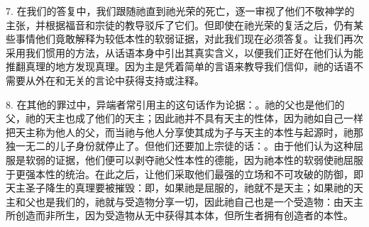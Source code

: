 7. 在我们的答复中，我们跟随祂直到祂光荣的死亡，逐一审视了他们不敬神学的主张，并根据福音和宗徒的教导驳斥了它们。但即使在祂光荣的复活之后，仍有某些事情他们竟敢解释为较低本性的软弱证据，对此我们现在必须答复。让我们再次采用我们惯用的方法，从话语本身中引出其真实含义，以便我们正好在他们认为能推翻真理的地方发现真理。因为主是凭着简单的言语来教导我们信仰，祂的话语不需要从外在和无关的言论中获得支持或注释。\par

8. 在其他的罪过中，异端者常引用主的这句话作为论据：。祂的父也是他们的父，祂的天主也成了他们的天主；因此祂并不具有天主的性体，因为祂如自己一样把天主称为他人的父，而当祂与他人分享使其成为子与天主的本性与起源时，祂那独一无二的儿子身份就停止了。但他们还要加上宗徒的话：。由于他们认为这种屈服是软弱的证据，他们便可以剥夺祂父性本性的德能，因为祂本性的软弱使祂屈服于更强本性的统治。在此之后，让他们采取他们最强的立场和不可攻破的防御，即天主圣子降生的真理要被摧毁：即，如果祂是屈服的，祂就不是天主；如果祂的天主和父也是我们的，祂就与受造物分享一切，因此祂自己也是一个受造物：由天主所创造而非所生，因为受造物从无中获得其本体，但所生者拥有创造者的本性。\par

